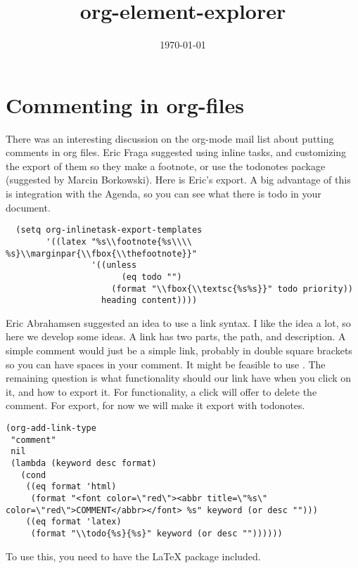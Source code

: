 \documentclass[11pt]{article}
\date{\today}
\title{org-element-explorer}
\begin{document}
\section{Commenting in org-files}
\label{sec-1}
There was an interesting discussion on the org-mode mail list about putting comments in org files. Eric Fraga suggested using inline tasks, and customizing the export of them so they make a footnote, or use the todonotes package (suggested by Marcin Borkowski). Here is Eric's export. A big advantage of this is integration with the Agenda, so you can see what there is todo in your document.

\begin{verbatim}
  (setq org-inlinetask-export-templates
        '((latex "%s\\footnote{%s\\\\ %s}\\marginpar{\\fbox{\\thefootnote}}"
                 '((unless
                       (eq todo "")
                     (format "\\fbox{\\textsc{%s%s}}" todo priority))
                   heading content))))
\end{verbatim}

Eric Abrahamsen suggested an idea to use a link syntax. I like the idea a lot, so here we develop some ideas. A link has two parts, the path, and description. A simple comment would just be a simple link, probably in double square brackets so you can have spaces in your comment.  It might be feasible to use . The remaining question is what functionality should our link have when you click on it, and how to export it. For functionality, a click will offer to delete the comment. For export, for now we will make it export with todonotes.

\listoftodos

\begin{verbatim}
(org-add-link-type
 "comment"
 nil
 (lambda (keyword desc format)
   (cond
    ((eq format 'html)
     (format "<font color=\"red\"><abbr title=\"%s\" color=\"red\">COMMENT</abbr></font> %s" keyword (or desc "")))
    ((eq format 'latex)
     (format "\\todo{%s}{%s}" keyword (or desc ""))))))
\end{verbatim}

To use this, you need to have the \LaTeX{} package included.
\end{document}
